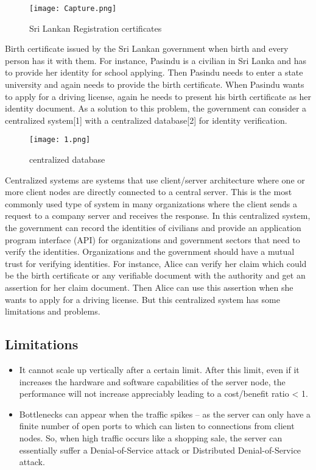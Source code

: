  \begin{figure}[H]
    \centering
    \texttt{[image: Capture.png]}
    \caption{Sri Lankan Registration certificates}
    \label{fig:threshold}
  \end{figure}

  Birth certificate issued by the Sri Lankan government when birth and every person has it with them. 
  For instance, Pasindu is a civilian in Sri Lanka and has to provide her identity for school applying. 
  Then Pasindu needs to enter a state university and again needs to provide the birth certificate. 
  When Pasindu wants to apply for a driving license, again he needs to present his birth certificate 
  as her identity document. As a solution to this problem, the government can consider a centralized 
  system[1] with a centralized database[2] for identity verification.
  
  \begin{figure}[H]
    \centering
    \texttt{[image: 1.png]}
    \caption{centralized database}
    \label{fig:threshold}
  \end{figure}

  Centralized systems are systems that use client/server architecture where one or more client nodes 
  are directly connected to a central server. This is the most commonly used type of system in many 
  organizations where the client sends a request to a company server and receives the response. 
  In this centralized system, the government can record the identities of civilians and provide 
  an application program interface (API) for organizations and government sectors that need to 
  verify the identities. Organizations and the government should have a mutual trust for verifying 
  identities. For instance, Alice can verify her claim which could be the birth certificate or any 
  verifiable document with the authority and get an assertion for her claim document. Then Alice 
  can use this assertion when she wants to apply for a driving license. But this centralized 
  system has some limitations and problems.

  \subsection{Limitations}

  \begin{itemize}
    \item It cannot scale up vertically after a certain limit. After this limit, even if it increases 
    the hardware and software capabilities of the server node, the performance will not increase 
    appreciably leading to a cost/benefit ratio < 1.
    \item Bottlenecks can appear when the traffic spikes – as the server can only have a finite number
     of open ports to which can listen to connections from client nodes. So, when high traffic occurs
      like a shopping sale, the server can essentially suffer a Denial-of-Service attack or Distributed
       Denial-of-Service attack.
      
  \end{itemize}

